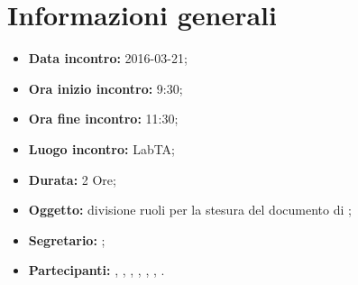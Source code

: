 \newpage
\section{Informazioni generali}
\begin{itemize}
\item \textbf{Data incontro:} 2016-03-21;
\item \textbf{Ora inizio incontro:} 9:30;
\item \textbf{Ora fine incontro:} 11:30;
\item \textbf{Luogo incontro:} LabTA;
\item \textbf{Durata:} 2 Ore;
\item \textbf{Oggetto:} divisione ruoli per la stesura del documento di \DdPv;
\item \textbf{Segretario:} \GR;
\item \textbf{Partecipanti:} \AF, \FB, \GN, \GR, \MV, \MP, \SM.

\end{itemize}
